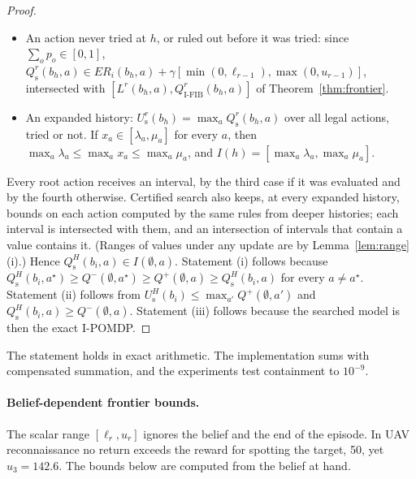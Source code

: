 \documentclass{article}
\newcommand{\ER}{\mathit{ER}}
\begin{document}
\begin{proof}
\begin{itemize}
\item An action never tried at $h$, or ruled out before it was tried: since $\sum_o p_o \in [0, 1]$, $Q^r_{\mathrm{s}}(b_h, a) \in \ER_i(b_h, a) + \gamma [\min(0, \ell_{r-1}), \max(0, u_{r-1})]$, intersected with $[L^r(b_h, a), Q^r_{\mathrm{I\text{-}FIB}}(b_h, a)]$ of Theorem~\ref{thm:frontier}.
\item An expanded history: $U^r_{\mathrm{s}}(b_h) = \max_a Q^r_{\mathrm{s}}(b_h, a)$ over all legal actions, tried or not. If $x_a \in [\lambda_a, \mu_a]$ for every $a$, then $\max_a \lambda_a \leq \max_a x_a \leq \max_a \mu_a$, and $I(h) = [\max_a \lambda_a, \max_a \mu_a]$.
\end{itemize}
Every root action receives an interval, by the third case if it was evaluated and by the fourth otherwise. Certified search also keeps, at every expanded history, bounds on each action computed by the same rules from deeper histories; each interval is intersected with them, and an intersection of intervals that contain a value contains it. (Ranges of values under any update are by Lemma~\ref{lem:range}(i).) Hence $Q^H_{\mathrm{s}}(b_i, a) \in I(\emptyset, a)$. Statement (i) follows because $Q^H_{\mathrm{s}}(b_i, a^\star) \geq Q^-(\emptyset, a^\star) \geq Q^+(\emptyset, a) \geq Q^H_{\mathrm{s}}(b_i, a)$ for every $a \neq a^\star$. Statement (ii) follows from $U^H_{\mathrm{s}}(b_i) \leq \max_{a'} Q^+(\emptyset, a')$ and $Q^H_{\mathrm{s}}(b_i, a) \geq Q^-(\emptyset, a)$. Statement (iii) follows because the searched model is then the exact I-POMDP.
\end{proof}

The statement holds in exact arithmetic. The implementation sums with compensated summation, and the experiments test containment to $10^{-9}$.

\paragraph{Belief-dependent frontier bounds.} The scalar range $[\ell_r, u_r]$ ignores the belief and the end of the episode. In UAV reconnaissance no return exceeds the reward for spotting the target, 50, yet $u_3 = 142.6$. The bounds below are computed from the belief at hand.
\end{document}
